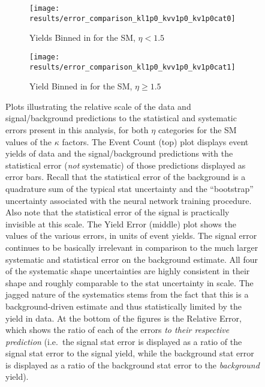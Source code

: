     \begin{figure}
        \centering
        \begin{subfigure}{0.48\textwidth} 
            \texttt{[image: results/error\_comparison\_kl1p0\_kvv1p0\_kv1p0cat0]}
            \caption{Yields Binned in \mhh for the SM, $\eta < 1.5$}
            \label{fig:error_dump_eta0_1p00_1p00_1p00}
        \end{subfigure}
        \begin{subfigure}{0.48\textwidth}
            \texttt{[image: results/error\_comparison\_kl1p0\_kvv1p0\_kv1p0cat1]}
            \caption{Yield Binned in \deta for the SM, $\eta \geq 1.5$}
            \label{fig:error_dump_eta1_hh_1p00_1p00_1p00}
        \end{subfigure}
        \caption{
            \scriptsize
            Plots illustrating the relative scale of the data and signal/background predictions
                to the statistical and systematic errors present in this analysis,
                for both $\eta$ categories for the SM values of the $\kappa$ factors.
            The Event Count (top) plot displays event yields of data and the signal/background predictions
                with the statistical error (\textit{not} systematic) of those predictions displayed as error bars.
            Recall that the statistical error of the background is a quadrature sum of the typical stat uncertainty
                and the ``bootstrap'' uncertainty associated with the neural network training procedure.
            Also note that the statistical error of the signal is practically invisible at this scale.
            The Yield Error (middle) plot shows the values of the various errors, in units of event yields.
            The signal error continues to be basically irrelevant in comparison to the much larger
                systematic and statistical error on the background estimate.
            All four of the systematic shape uncertainties are highly consistent in their shape
                and roughly comparable to the stat uncertainty in scale.
            The jagged nature of the systematics stems from the fact that this is a background-driven estimate
                and thus statistically limited by the yield in data.
            At the bottom of the figures is the Relative Error, which shows the ratio of each of the errors
                \textit{to their respective prediction}
                (i.e.\ the signal stat error is displayed as a ratio of the signal stat error to the signal yield,
                while the background stat error is displayed as a ratio of the background stat error to the \textit{background} yield).
        }
        \label{fig:error_dump_sm}
    \end{figure}

